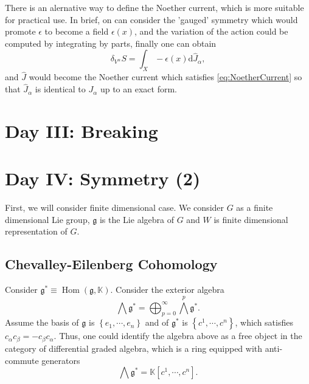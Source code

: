 \documentclass[10pt]{article}
\newcommand{\Hom}{\operatorname{Hom}}
\begin{document}
There is an alernative way to define the Noether current, which is more suitable for practical use. In brief, on can consider the 'gauged' symmetry which would promote $ \epsilon$ to become a field $ \epsilon(x)$, and the variation of the action could be computed by integrating by parts, finally one can obtain
\begin{equation*}
  \delta_{V^{\alpha}} S = \int _{X} - \epsilon(x) \mathrm{d} \hat{J}_{\alpha},
\end{equation*}
and $ \hat{J}$ would become the Noether current which satisfies \eqref{eq:NoetherCurrent} so that $ \hat{J}_{\alpha}$ is identical to $ J_{\alpha}$ up to an exact form.

\section{Day III: Breaking}

\section{Day IV: Symmetry (2)}

First, we will consider finite dimensional case. We consider $ G$ as a finite dimensional Lie group, $ \mathfrak{g} $ is the Lie algebra of $ G$ and $ W$ is finite dimensional representation of $ G$.

\subsection{Chevalley-Eilenberg Cohomology}

Consider $ \mathfrak{g}^{*} \equiv \Hom(\mathfrak{g}, \mathbb{K})$. Consider the exterior algebra
\begin{equation*}
  \bigwedge \mathfrak{g}^{*} = \bigoplus_{p=0}^{\infty } \bigwedge^{p} \mathfrak{g}^{*}.
\end{equation*}
Assume the basis of $ \mathfrak{g}$ is $\left\{ e_1,\cdots ,e_{n} \right\}$ and of $ \mathfrak{g}^{*}$ is $\left\{ c^{1},\cdots ,c^{n} \right\}$, which satisfies $ c_{\alpha} c_{\beta} = - c_{\beta} c_{\alpha}$. Thus, one could identify the algebra above as a free object in the category of differential graded algebra, which is a ring equipped with anti-commute generators
\begin{equation*}
  \bigwedge \mathfrak{g}^{*} = \mathbb{K}[c^{1},\cdots ,c^{n}].
\end{equation*}
\end{document}
